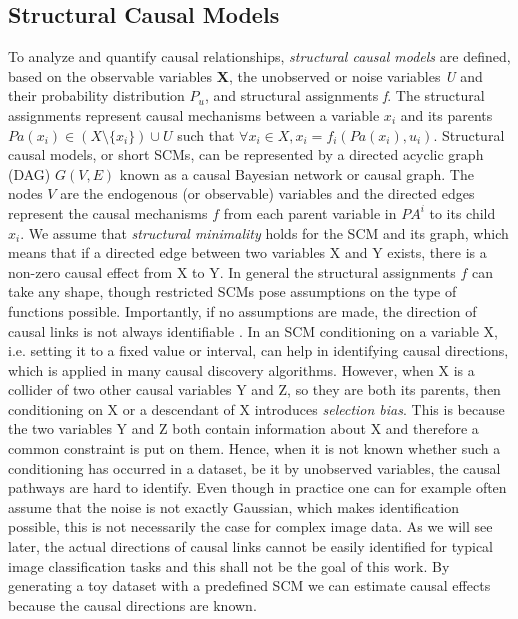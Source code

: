 \subsection{Structural Causal Models}
To analyze and quantify causal relationships, \textit{structural causal models} are defined, based on the observable variables \textbf{X}, the unobserved or noise variables \textit{U} and their probability distribution $P_u$, and structural assignments \textit{f}. The structural assignments represent causal mechanisms between a variable $x_i$ and its parents $Pa(x_i) \in (X \setminus \{x_i\}) \cup U$  such that $\forall x_i \in X, x_i = f_i(Pa(x_i),u_i)$. 
Structural causal models, or short SCMs, can be represented by a directed acyclic graph (DAG) $G(V,E)$ known as a causal Bayesian network or causal graph. The nodes $V$ are the endogenous (or observable) variables and the directed edges represent the causal mechanisms $f$ from each parent variable in $PA^i$ to its child $x_i$. We assume that \textit{structural minimality} holds for the SCM and its graph, which means that if a directed edge between two variables X and Y exists, there is a non-zero causal effect from X to Y. 
In general the structural assignments $f$ can take any shape, though restricted SCMs pose assumptions on the type of functions possible. Importantly, if no assumptions are made, the direction of causal links is not always identifiable \cite{Peters2017}. In an SCM conditioning on a variable X, i.e. setting it to a fixed value or interval, can help in identifying causal directions, which is applied in many causal discovery algorithms. However, when X is a collider of two other causal variables Y and Z, so they are both its parents, then conditioning on X or a descendant of X introduces \textit{selection bias}. This is because the two variables Y and Z both contain information about X and therefore a common constraint is put on them. Hence, when it is not known whether such a conditioning has occurred in a dataset, be it by unobserved variables, the causal pathways are hard to identify. 
Even though in practice one can for example often assume that the noise is not exactly Gaussian, which makes identification possible, this is not necessarily the case for complex image data. As we will see later, the actual directions of causal links cannot be easily identified for typical image classification tasks and this shall not be the goal of this work. By generating a toy dataset with a predefined SCM we can estimate causal effects because the causal directions are known.

